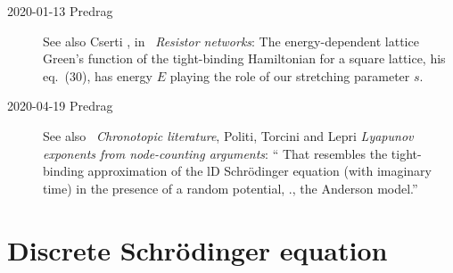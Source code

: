 \begin{description}
    \item[2020-01-13 Predrag]
See also Cserti \etal{}, in
~{\em Resistor networks}:
The energy-dependent lattice Green's function of the tight-binding
Hamiltonian for a square lattice, his eq.~(30), has energy $E$ playing
the role of our stretching parameter $s$.


  \item[2020-04-19  Predrag]
See also ~{\em Chronotopic literature},
Politi, Torcini and Lepri
{\em {Lyapunov} exponents from node-counting arguments}: ``
That resembles the
tight-binding approximation of the lD Schr\"odinger equation (with
imaginary time) in the presence of a random potential, \ie., the Anderson
model.''
\end{description}

\section{Discrete Schr{\"o}dinger equation}
\label{sect:Schrodinger}


